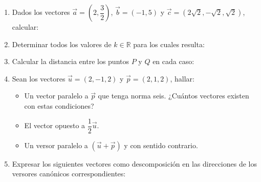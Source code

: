 \begin{enumerate}[\hspace{-3mm}$1)$]
\item Dados los vectores $\vec a=\left(2,\dfrac32\right)$, $\vec b=(-1,5)$ y $\vec c=(2\sqrt2,-\sqrt2,\sqrt2)$, calcular:
\begin{itemize}
\end{itemize}

\item Determinar todos los valores de $k\in\mathbb{R}$ para los cuales resulta:
\begin{itemize}
\end{itemize}

\item Calcular la distancia entre los puntos $P$ y $Q$ en cada caso:
\begin{enumerate}[a)]
\end{enumerate}

\item Sean los vectores $\vec u=(2,-1,2)$ y $\vec p=(2,1,2)$, hallar:
\begin{itemize}
\item[a)] Un vector paralelo a $\vec p$ que tenga norma seis. ¿Cuántos vectores existen con estas condiciones?
\item[b)] El vector opuesto a $\dfrac12\vec u$.
\item[c)] Un versor paralelo a $(\vec u+\vec p)$ y con sentido contrario.
\end{itemize}

\item Expresar los siguientes vectores como descomposición en las direcciones de los versores canónicos correspondientes:
\begin{itemize}
\end{itemize}


\end{enumerate}
